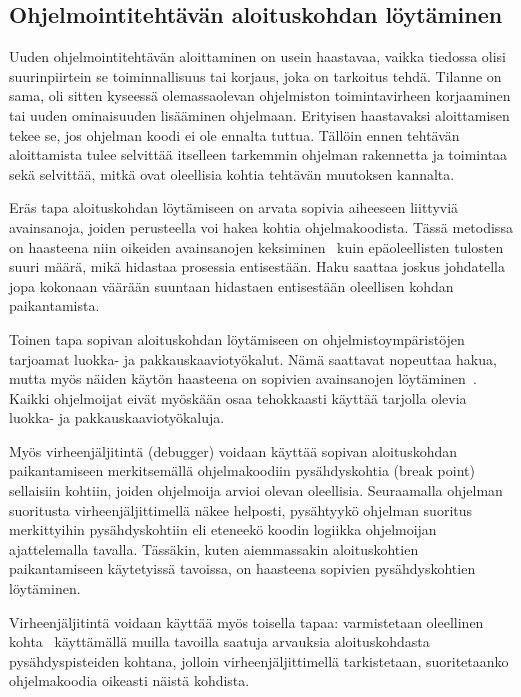 \documentclass[finnish]{tktltiki2}
\theoremstyle{definition}
\theoremstyle{remark}
\begin{document}
\subsection{Ohjelmointitehtävän aloituskohdan löytäminen}

Uuden ohjelmointitehtävän aloittaminen on usein haastavaa, vaikka tiedossa olisi suurinpiirtein se toiminnallisuus tai korjaus, joka on tarkoitus tehdä. Tilanne on sama, oli sitten kyseessä olemassaolevan ohjelmiston toimintavirheen korjaaminen tai uuden ominaisuuden lisääminen ohjelmaan. Erityisen haastavaksi aloittamisen tekee se, jos ohjelman koodi ei ole ennalta tuttua. Tällöin ennen tehtävän aloittamista tulee selvittää itselleen tarkemmin ohjelman rakennetta ja toimintaa sekä selvittää, mitkä ovat oleellisia kohtia tehtävän muutoksen kannalta.

Eräs tapa aloituskohdan löytämiseen on arvata sopivia aiheeseen liittyviä avainsanoja, joiden perusteella voi hakea kohtia ohjelmakoodista. Tässä metodissa on haasteena niin oikeiden avainsanojen keksiminen~\cite{what-to-search-for} kuin epäoleellisten tulosten suuri määrä, mikä hidastaa prosessia entisestään. Haku saattaa joskus johdatella jopa kokonaan väärään suuntaan hidastaen entisestään oleellisen kohdan paikantamista.

Toinen tapa sopivan aloituskohdan löytämiseen on ohjelmistoympäristöjen tarjoamat luokka- ja pakkauskaaviotyökalut. Nämä saattavat nopeuttaa hakua, mutta myös näiden käytön haasteena on sopivien avainsanojen löytäminen~\cite{what-to-search-for}. Kaikki ohjelmoijat eivät myöskään osaa tehokkaasti käyttää tarjolla olevia luokka- ja pakkauskaaviotyökaluja.

Myös virheenjäljitintä (debugger) voidaan käyttää sopivan aloituskohdan paikantamiseen merkitsemällä ohjelmakoodiin pysähdyskohtia (break point) sellaisiin kohtiin, joiden ohjelmoija arvioi olevan oleellisia.
Seuraamalla ohjelman suoritusta virheenjäljittimellä näkee helposti, pysähtyykö ohjelman suoritus merkittyihin pysähdyskohtiin eli eteneekö koodin logiikka ohjelmoijan ajattelemalla tavalla.
Tässäkin, kuten aiemmassakin aloituskohtien paikantamiseen käytetyissä tavoissa, on haasteena sopivien pysähdyskohtien löytäminen.

Virheenjäljitintä voidaan käyttää myös toisella tapaa: varmistetaan oleellinen kohta~\cite{eliciting-design-requirements-for-maintenance-oriented-ides} käyttämällä muilla tavoilla saatuja arvauksia aloituskohdasta pysähdyspisteiden kohtana, jolloin virheenjäljittimellä tarkistetaan, suoritetaanko ohjelmakoodia oikeasti näistä kohdista.
\end{document}
